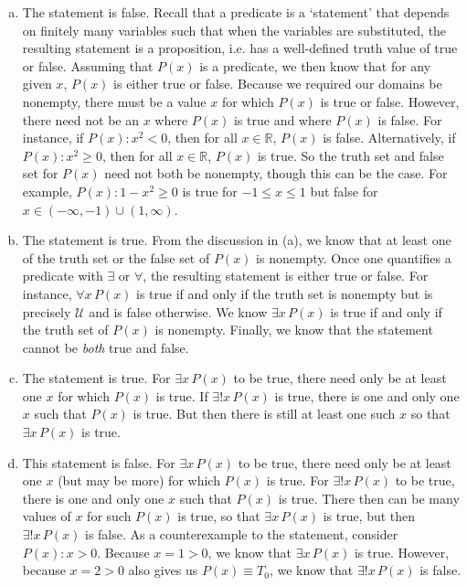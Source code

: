 \documentclass[11pt,letterpaper]{article}
\begin{document}
\sol
\begin{enumerate}[(a)]
\item The statement is false. Recall that a predicate is a `statement' that depends on finitely many variables such that when the variables are substituted, the resulting statement is a proposition, i.e. has a well-defined truth value of true or false. Assuming that $P(x)$ is a predicate, we then know that for any given $x$, $P(x)$ is either true or false. Because we required our domains be nonempty, there must be a value $x$ for which $P(x)$ is true or false. However, there need not be an $x$ where $P(x)$ is true and where $P(x)$ is false. For instance, if $P(x): x^2 < 0$, then for all $x \in \mathbb{R}$, $P(x)$ is false. Alternatively, if $P(x): x^2 \geq 0$, then for all $x \in \mathbb{R}$, $P(x)$ is true. So the truth set and false set for $P(x)$ need not both be nonempty, though this can be the case. For example, $P(x): 1 - x^2 \geq 0$ is true for $-1 \leq x \leq 1$ but false for $x \in (-\infty, -1) \cup (1, \infty)$. \pspace

\item The statement is true. From the discussion in (a), we know that at least one of the truth set or the false set of $P(x)$ is nonempty. Once one quantifies a predicate with $\exists$ or $\forall$, the resulting statement is either true or false. For instance, $\forall x\, P(x)$ is true if and only if the truth set is nonempty but is precisely $\mathcal{U}$ and is false otherwise. We know $\exists x\, P(x)$ is true if and only if the truth set of $P(x)$ is nonempty. Finally, we know that the statement cannot be \textit{both} true and false. \pspace

\item The statement is true. For $\exists x\, P(x)$ to be true, there need only be at least one $x$ for which $P(x)$ is true. If $\exists! x\, P(x)$ is true, there is one and only one $x$ such that $P(x)$ is true. But then there is still at least one such $x$ so that $\exists x\, P(x)$ is true. \pspace

\item This statement is false. For $\exists x\, P(x)$ to be true, there need only be at least one $x$ (but may be more) for which $P(x)$ is true. For $\exists! x\, P(x)$ to be true, there is one and only one $x$ such that $P(x)$ is true. There then can be many values of $x$ for such $P(x)$ is true, so that $\exists x\, P(x)$ is true, but then $\exists! x\, P(x)$ is false. As a counterexample to the statement, consider $P(x): x > 0$. Because $x= 1 > 0$, we know that $\exists x\, P(x)$ is true. However, because $x= 2 > 0$ also gives us $P(x) \equiv T_0$, we know that $\exists! x\, P(x)$ is false. 
\end{enumerate}
\end{document}

